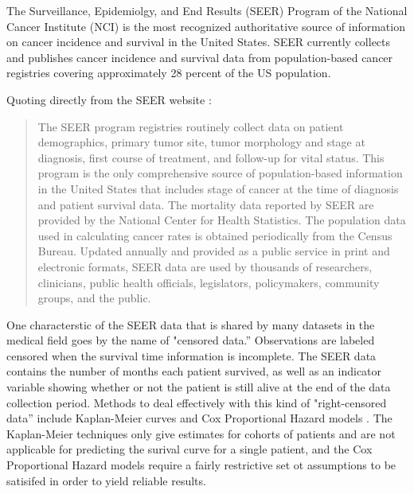 \documentclass[10pt,letterpaper]{article}
\begin{document}
The Surveillance, Epidemiolgy, and End Results (SEER) Program of the National Cancer Institute (NCI) is the most recognized authoritative source of information on cancer incidence and survival in the United States. SEER currently collects and publishes cancer incidence and survival data from population-based cancer registries covering approximately 28 percent of the US population.


Quoting directly from the SEER
website \cite{seerwebsite}:

\begin{quote}
The SEER program registries routinely collect data on patient demographics, primary tumor site, tumor morphology and stage at diagnosis, first course of treatment, and follow-up for vital status. This program is the only comprehensive source of population-based information in the United States that includes stage of cancer at the time of diagnosis and patient survival data. The mortality data reported by SEER are provided by the National Center for Health Statistics. The population data used in calculating cancer rates is obtained periodically from the Census Bureau. Updated annually and provided as a public service in print and electronic formats, SEER data are used by thousands of researchers, clinicians, public health officials, legislators, policymakers, community groups, and the public.
\end{quote}



One characterstic of the SEER data that is shared by many datasets in the medical field 
goes by the name of "censored data.''
Observations are labeled censored when the survival time information is incomplete.
 The SEER data contains the number of months each patient survived, as well as an indicator variable showing whether or not the patient is still alive at the end of the data collection period.
Methods to deal effectively with this kind of "right-censored data'' include Kaplan-Meier curves
and Cox Proportional Hazard models \cite{cam}. The Kaplan-Meier techniques only give estimates for cohorts of patients and are not applicable for predicting the surival curve for a single patient, and the Cox Proportional Hazard models require a fairly restrictive set ot assumptions to be satisifed in order to yield reliable results. 
\end{document}
